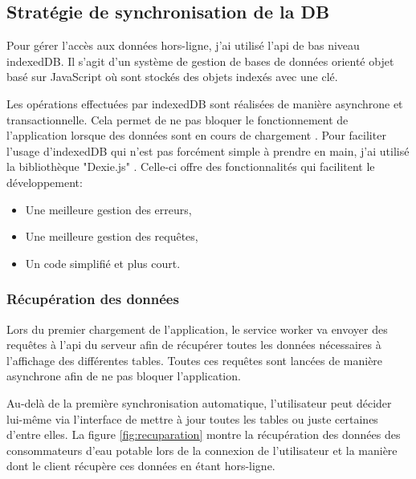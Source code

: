 \documentclass{EPL-master-thesis-covers-FR}
\begin{document}
					
			\subsection*{Stratégie de synchronisation de la DB}
				Pour gérer l'accès aux données hors-ligne, j'ai utilisé l'\gls{api} de bas niveau indexedDB. Il s'agit d'un système de gestion de bases de données orienté objet basé sur JavaScript où sont stockés des objets indexés avec une clé. 
				
				Les opérations effectuées par indexedDB sont réalisées de manière asynchrone et transactionnelle. Cela permet de ne pas bloquer le fonctionnement de l'application lorsque des données sont en cours de chargement \cite{ref:indexedDB}. Pour faciliter l'usage d'indexedDB qui n'est pas forcément simple à prendre en main, j'ai utilisé la bibliothèque "Dexie.js" \cite{ref:dexie}. Celle-ci offre des fonctionnalités qui facilitent le développement: 
				\begin{itemize}[noitemsep]
					\item Une meilleure gestion des erreurs,
					\item Une meilleure gestion des requêtes,
					\item Un code simplifié et plus court.
				\end{itemize}					
				
				
				\subsubsection*{Récupération des données}
					Lors du premier chargement de l'application, le service worker va envoyer des requêtes à l'\gls{api} du serveur afin de récupérer toutes les données nécessaires à l'affichage des différentes tables. Toutes ces requêtes sont lancées de manière asynchrone afin de ne pas bloquer l'application. 
					
					Au-delà de la première synchronisation automatique, l'utilisateur peut décider lui-même via l'interface de mettre à jour toutes les tables ou juste certaines d'entre elles. La figure \ref{fig:recuparation} montre la récupération des données des consommateurs d'eau potable lors de la connexion de l'utilisateur et la manière dont le client récupère ces données en étant hors-ligne.
					
\end{document}
